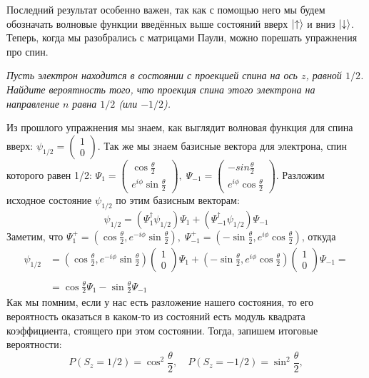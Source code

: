 Последний результат особенно важен, так как с помощью него мы будем обозначать волновые функции введённых выше состояний вверх $\ket{\uparrow}$ и вниз $\ket{\downarrow}$.
Теперь, когда мы разобрались с матрицами Паули, можно порешать упражнения про спин.
\begin{center}
    \textit{Пусть электрон находится в состоянии с проекцией спина на ось $z$, равной $1/2$. Найдите вероятность того, что проекция спина этого электрона на направление $n$ равна $1/2$ (или $-1/2$).}
\end{center}
Из прошлого упражнения мы знаем, как выглядит волновая функция для спина вверх: $\psi_{1/2} = \left(\begin{array}{c} 1 \\ 0 \end{array}\right)$. Так же мы знаем базисные вектора для электрона, спин которого равен 1/2: $\Psi_1 = \left(\begin{array}{c}  \cos \frac{\theta}{2} \\ e^{i\phi} \sin\frac{\theta}{2}\end{array}\right),\; \Psi_{-1} = \left(\begin{array}{c} -sin\frac{\theta}{2} \\ e^{i\phi}\cos\frac{\theta}{2} \end{array} \right)$. Разложим исходное состояние $\psi_{1/2}$ по этим базисным векторам:
\[
\psi_{1/2} = (\Psi_1^{\dagger}\psi_{1/2})\Psi_1 + (\Psi_{-1}^{\dagger}\psi_{1/2})\Psi_{-1}
\]
Заметим, что $\Psi_1^{+} = (\cos\frac{\theta}{2}, e^{-i\phi}\sin\frac{\theta}{2}), \; \Psi_{-1}^{+} = (-\sin\frac{\theta}{2}, e^{i\phi}\cos\frac{\theta}{2})$, откуда
\begin{align*}
    \psi_{1/2} &= (\cos\frac{\theta}{2}, e^{-i\phi}\sin\frac{\theta}{2}) \left(\begin{array}{c} 1 \\ 0 \end{array}\right)\Psi_1 + (-\sin\frac{\theta}{2}, e^{i\phi}\cos\frac{\theta}{2}) \left(\begin{array}{c}
    1 \\ 0 \end{array}\right)\Psi_{-1} = \\
\\ &= \cos\frac{\theta}{2}\Psi_1 - \sin\frac{\theta}{2}\Psi_{-1}
\end{align*}
Как мы помним, если у нас есть разложение нашего состояния, то его вероятность оказаться в каком-то из состояний есть модуль квадрата коэффициента, стоящего при этом состоянии. Тогда, запишем итоговые вероятности:
\[
    P(S_z = 1/2) = \cos^2\frac{\theta}{2},\quad P(S_z = -1/2) = \sin^2\frac{\theta}{2},
\]
